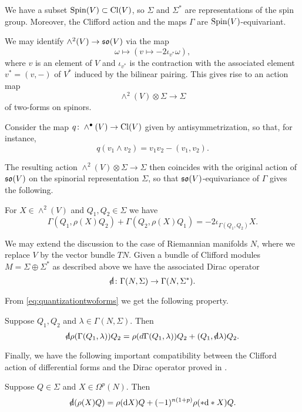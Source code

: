 \documentclass[10pt, oneside]{article}
\begin{document}
We have a subset $\mathrm{Spin}(V)\subset \mathrm{Cl}(V)$, so $\Sigma$ and $\Sigma^*$ are representations of the spin group. Moreover, the Clifford action and the maps $\Gamma$ are $\mathrm{Spin}(V)$-equivariant.

We may identify $\wedge^2(V)\rightarrow \mathfrak{so}(V)$ via the map
\[\omega\mapsto (v\mapsto -2\iota_{v^*} \omega),\]
where $v$ is an element of $V$ and $\iota_{v^*}$ is the contraction with the associated element $v^* = (v,-)$ of $V^*$ induced by the bilinear pairing.  This gives rise to an action map
\[\wedge^2(V)\otimes \Sigma\longrightarrow \Sigma\]
of two-forms on spinors.

Consider the map $q\colon \wedge^\bullet(V)\rightarrow \mathrm{Cl}(V)$ given by antisymmetrization, so that, for instance,
\begin{equation}
q(v_1\wedge v_2) = v_1v_2 - (v_1, v_2).
\label{eq:quantizationtwoforms}
\end{equation}

The resulting action $\wedge^2(V)\otimes \Sigma\rightarrow \Sigma$ then coincides with the original action of $\mathfrak{so}(V)$ on the spinorial representation $\Sigma$, so that $\mathfrak{so}(V)$-equivariance of $\Gamma$ gives the following.

\begin{prop}
For $X\in\wedge^2(V)$ and $Q_1,Q_2\in\Sigma$ we have
\[\Gamma(Q_1, \rho(X) Q_2) + \Gamma(Q_2, \rho(X) Q_1) = -2\iota_{\Gamma(Q_1, Q_2)} X.\]
\label{prop:cliffordactionproperty1}
\end{prop}

We may extend the discussion to the case of Riemannian manifolds $N$, where we replace $V$ by the vector bundle $TN$. Given a bundle of Clifford modules $M=\Sigma\oplus \Sigma^*$ as described above we have the associated Dirac operator
\[\sd{\d}\colon \Gamma(N, \Sigma)\rightarrow \Gamma(N, \Sigma^*).\]

From \eqref{eq:quantizationtwoforms} we get the following property.

\begin{prop}
Suppose $Q_1,Q_2$ and $\lambda\in\Gamma(N, \Sigma)$. Then
\[\sd{\d}\rho(\Gamma(Q_1, \lambda)) Q_2 = \rho(d \Gamma(Q_1, \lambda)) Q_2 + (Q_1, \sd{\d} \lambda) Q_2.\]
\label{prop:cliffordactionproperty2}
\end{prop}

Finally, we have the following important compatibility between the Clifford action of differential forms and the Dirac operator proved in \cite[equation 7.6]{Snygg}.

\begin{prop}
Suppose $Q\in\Sigma$ and $X\in\Omega^p(N)$. Then
\[\sd{\d}(\rho(X) Q) = \rho(\d X)Q + (-1)^{n(1+p)}\rho(\ast \d\ast X) Q.\]
\label{prop:cliffordactionproperty3}
\end{prop}
\end{document}
